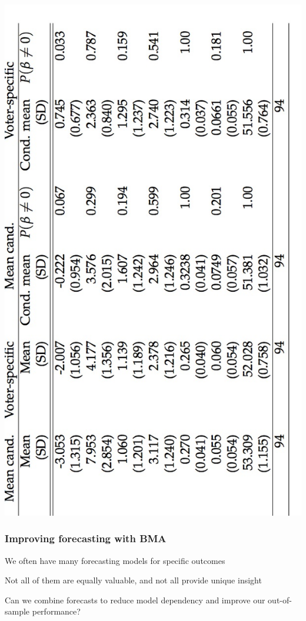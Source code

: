 \documentclass[xcolor=dvipsnames]{beamer}
\begin{document}
\begin{frame}

\centering
\includegraphics[angle=270, scale=.3]{Table}

\end{frame}

\begin{frame}
\frametitle{Improving forecasting with BMA}

\bi
\item We often have many forecasting models for specific outcomes
\item Not all of them are equally valuable, and not all provide unique
  insight
\item Can we combine forecasts to reduce model dependency and improve
  our out-of-sample performance?
\ei

\end{frame}
\end{document}
